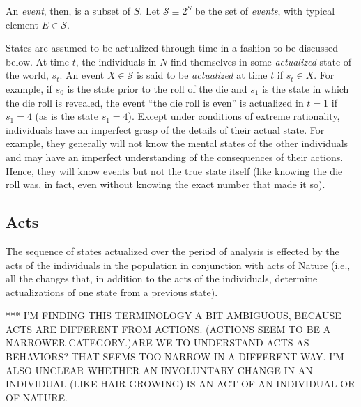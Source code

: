 \documentclass[
11pt,
titlepage,
reqno,
]{article}%
\theoremstyle{definition}
\begin{document}
	An \textit{event}, then, is a subset of $S$.  
	Let $\mathcal{S}\equiv 2^S$ be the set of \textit{events}, with typical element $E\in \mathcal{S}$. 
	
	
	States are assumed to be actualized through time in a fashion to be discussed below. 
	At time $t$, the individuals in $N$ find themselves in some \textit{actualized} state of the world, $s_t$. 
	An event $X\in\mathcal{S}$ is said to be \textit{actualized} at time $t$ if $s_t\in X$. 
	For example, if $s_0$ is the state prior to the roll of the die and $s_1$ is the state in which the die roll is revealed, the event ``the die roll is even'' is actualized in $t=1$ if $s_1=4$ (as is the state $s_1=4$).
	Except under conditions of extreme rationality, individuals  have an imperfect grasp of the details of their actual state.
	For example, they generally will not know the mental states of the other individuals and may have an imperfect understanding of the consequences of their actions.
	Hence, they will know events but not the true state  itself (like knowing the die roll was, in fact, even without knowing the exact number that made it so).
	
	
	
	\subsection{Acts\label{sec:dynamics}}
	The sequence of states actualized over the period of analysis is effected by the acts of the individuals in the population in conjunction with acts of Nature (i.e., all the changes that, in addition to the acts of the individuals, determine actualizations of one state from a previous state). 
	
	*** I'M FINDING THIS TERMINOLOGY A BIT AMBIGUOUS, BECAUSE ACTS ARE DIFFERENT FROM ACTIONS. (ACTIONS SEEM TO BE A NARROWER CATEGORY.)ARE WE TO UNDERSTAND ACTS AS BEHAVIORS? THAT SEEMS TOO NARROW IN A DIFFERENT WAY. I'M ALSO UNCLEAR WHETHER AN INVOLUNTARY CHANGE IN AN INDIVIDUAL (LIKE HAIR GROWING) IS AN ACT OF AN INDIVIDUAL OR OF NATURE. 
	
\end{document}
